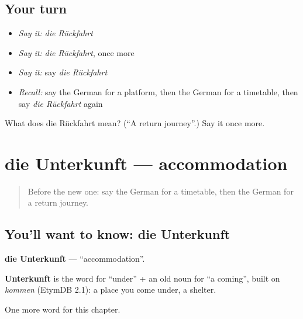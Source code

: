 \subsection*{Your turn}
\begin{itemize}
\raggedright
  \item \emph{Say it:} \emph{die Rückfahrt}
  \item \emph{Say it:} \emph{die Rückfahrt}, once more
  \item \emph{Say it:} say \emph{die Rückfahrt}
  \item \emph{Recall:} say the German for a platform, then the German for a timetable, then say \emph{die Rückfahrt} again
\end{itemize}

\begin{tcolorbox}[breakable,colback=teal!4,colframe=teal!35!black,title={Before you move on}]
What does die Rückfahrt mean? (\textquotedblleft{}A return journey\textquotedblright{}.) Say it once more.
\end{tcolorbox}
\section[die Unterkunft]{die Unterkunft — accommodation}

\label{lesson:GE-C193-unterkunft}



\begin{quote}
Before the new one: say the German for a timetable, then the German for a return journey.
\end{quote}

\subsection*{You'll want to know: die Unterkunft}
\textbf{die Unterkunft} — \textquotedblleft{}accommodation\textquotedblright{}.

\begin{cousinweb}
\textbf{Unterkunft} is the word for \textquotedblleft{}under\textquotedblright{} + an old noun for \textquotedblleft{}a coming\textquotedblright{}, built on \emph{kommen} (EtymDB 2.1): a place you come under, a shelter.
\end{cousinweb}

\begin{grammarlens}[title={What you've built}]
One more word for this chapter.
\end{grammarlens}

